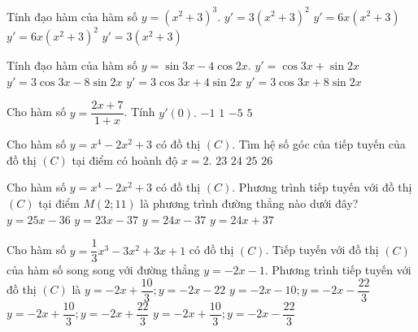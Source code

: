 \begin{ex}%
	Tính đạo hàm của hàm số  $y=\left (x^2+3\right )^3.$
	\choice
	{$y'=3(x^2+3)^2$}
	{$y'=6x(x^2+3)$}
	{\True $y'=6x(x^2+3)^2$}
	{$y'=3(x^2+3)$}
\end{ex}

\begin{ex}%
	Tính đạo hàm của hàm số $y=\sin 3x-4\cos 2x.$
	\choice
	{$y'=\cos 3x+\sin 2x$}
	{$y'=3\cos 3x-8\sin 2x$}
	{$y'=3\cos 3x+4\sin 2x$}
	{\True  $y'=3\cos 3x+8\sin 2x$}
\end{ex}

\begin{ex}%
	Cho hàm số $y=\dfrac{2x+7}{1+x}$. Tính $y'(0).$
	\choice
	{$-1$}
	{$1$}
	{\True $-5$}
	{$5$}
\end{ex}

\begin{ex}%
	Cho hàm số $y=x^4-2x^2+3$ có đồ thị $(C)$. Tìm hệ số góc của tiếp tuyến của đồ thị $(C)$ tại điểm có hoành độ $x=2.$
	\choice
	{$23$}
	{\True $24$}
	{$25$}
	{$26$}
\end{ex}

\begin{ex}%
	Cho hàm số $y=x^4-2x^2+3$ có đồ thị $(C)$. Phương trình tiếp tuyến với đồ thị $(C)$ tại điểm $M(2;11)$ là phương trình đường thẳng nào dưới đây?
	\choice
	{$y=25x-36$}
	{$y=23x-37$}
	{\True $y=24x-37$}
	{$y=24x+37$}
\end{ex}

\begin{ex}%
	Cho hàm số $y=\dfrac{1}{3}x^3-3x^2+3x+1$ có đồ thị $(C)$. Tiếp tuyến với đồ thị $(C)$ của hàm số song song với đường thẳng $y=-2x-1$. Phương trình tiếp tuyến với đồ thị $(C)$ là
	\choice
	{$y=-2x + \dfrac{10}{3} ; y=-2x - 22$}
	{$y=-2x - 10 ; y=-2x - \dfrac{22}{3}$}
	{$y=-2x + \dfrac{10}{3} ; y=-2x + \dfrac{22}{3}$}
	{\True $y=-2x + \dfrac{10}{3} ; y=-2x - \dfrac{22}{3}$}
\end{ex}


